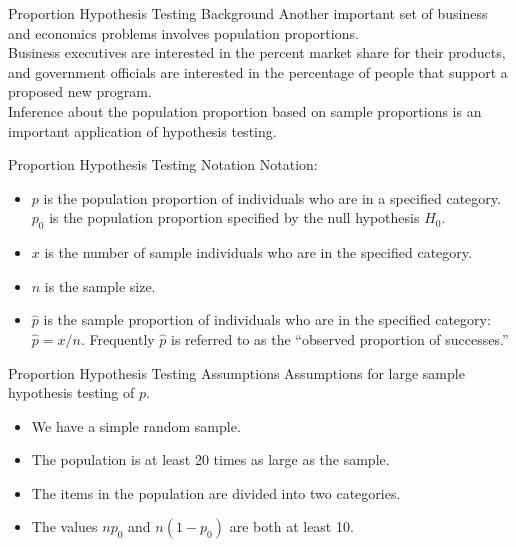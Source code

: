 \documentclass[pdf]{beamer}
\theoremstyle{remark}
\theoremstyle{definition}
\begin{document}
\begin{frame}[t]{Proportion Hypothesis Testing Background}
Another important set of business and economics problems involves population proportions. \\
\vspace{1.5ex}
Business executives are interested in the percent market share for their products, and government officials are interested in the percentage of people that support a proposed new program. \\
\vspace{1.5ex} 
Inference about the population proportion based on sample proportions is an important application of hypothesis testing. 
\end{frame}

\begin{frame}[t]{Proportion Hypothesis Testing Notation}
Notation: \\
\vspace{1.5ex}
\begin{itemize}
\item $p$ is the population proportion of individuals who are in a specified category. $p_0$ is the population proportion specified by the null hypothesis $H_0$.
\item $x$ is the number of sample individuals who are in the specified category.
\item $n$ is the sample size.
\item $\hat{p}$ is the sample proportion of individuals who are in the specified category:  $\hat{p} = x/n$. Frequently $\hat{p}$ is referred to as the  ``observed proportion of successes.''
\end{itemize}
\end{frame}

\begin{frame}[t]{Proportion Hypothesis Testing Assumptions}
Assumptions for large sample hypothesis testing of $p$. \\
\vspace{1.5ex}
\begin{itemize}
\item We have a simple random sample.
\item The population is at least 20 times as large as the sample.
\item The items in the population are divided into two categories.
\item The values $np_0$ and $n(1-p_0)$ are both at least 10.
\end{itemize}
\end{frame}
\end{document}
